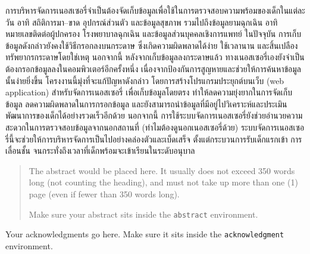 \maketitle
\makesignature

\ifproject
\begin{abstractTH}
การบริหารจัดการเนอสเซอรี่จำเป็นต้องจัดเก็บข้อมูลเพื่อใช้ในการตรวจสอบความพร้อมของเด็กในแต่ละวัน อาทิ สถิติการมา--ขาด อุปกรณ์ส่วนตัว และข้อมูลสุขภาพ รวมไปถึงข้อมูลยามฉุกเฉิน อาทิ หมายเลขติดต่อผู้ปกครอง โรงพยาบาลฉุกเฉิน และข้อมูลส่วนบุคคลเชิงการแพทย์
\enskip
ในปัจจุบัน การเก็บข้อมูลดังกล่าวยังคงใช้วิธีกรอกลงบนกระดาษ ซึ่งเกิดความผิดพลาดได้ง่าย ใช้เวลานาน และสิ้นเปลืองทรัพยากรกระดาษโดยใช่เหตุ
นอกจากนี้ หลังจากเก็บข้อมูลลงกระดาษแล้ว ทางเนอสเซอรี่เองยังจำเป็นต้องกรอกข้อมูลลงในคอมพิวเตอร์อีกครั้งหนึ่ง เนื่องจากป้องกันการสูญหายและช่วยให้การค้นหาข้อมูลนั้นง่ายยิ่งขึ้น 
\enskip
โครงงานนี้มุ่งที่จะแก้ปัญหาดังกล่าว โดยการสร้างโปรแกรมประยุกต์บนเว็บ (web application) สำหรับจัดการเนอสเซอรี่ เพื่อเก็บข้อมูลโดยตรง ทำให้ลดความยุ่งยากในการจัดเก็บข้อมูล ลดความผิดพลาดในการกรอกข้อมูล และยังสามารถนำข้อมูลที่มีอยู่ไปวิเคราะห์และประเมินพัฒนาการของเด็กได้อย่างรวดเร็วอีกด้วย
\enskip
นอกจากนี้ การใช้ระบบจัดการเนอสเซอรี่ยังช่วยอำนวยความสะดวกในการตรวจสอบข้อมูลจากนอกสถานที่ (ทำไมต้องดูนอกเนอสเซอรี่ด้วย)
\enskip
ระบบจัดการเนอสเซอรี่นี้จะช่วยให้การบริหารจัดการเป็นไปอย่างคล่องตัวและเบ็ดเสร็จ ตั้งแต่กระบวนการรับเด็กแรกเข้า การเลื่อนชั้น จนกระทั่งถึงเวลาที่เด็กพร้อมจะเข้าเรียนในระดับอนุบาล


\end{abstractTH}

\begin{abstract}
The abstract would be placed here. It usually does not exceed 350 words
long (not counting the heading), and must not take up more than one (1) page
(even if fewer than 350 words long).

Make sure your abstract sits inside the \texttt{abstract} environment.
\end{abstract}

\iffalse
\begin{dedication}
This document is dedicated to all Chiang Mai University students.

Dedication page is optional.
\end{dedication}
\fi %

\begin{acknowledgments}
Your acknowledgments go here. Make sure it sits inside the
\texttt{acknowledgment} environment.

\end{acknowledgments}%
\fi %

\contentspage

\ifproject
\figurelistpage

\tablelistpage
\fi %



